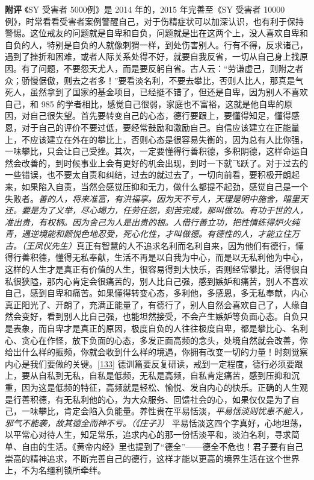 \begin{case}
    \textbf{附评} 《SY 受害者 5000例》是 2014 年的，2015 年完善至《SY 受害者 10000 例》，时常看看受害者案例警醒自己，对于伤精症状可以加深认识，也有利于保持警惕。这位戒友的问题就是自卑和自负，问题就是出在这两个上，没人喜欢自卑和自负的人，特别是自负的人就像刺猬一样，到处伤害别人。行有不得，反求诸己，遇到了挫折和困难，或者人际关系处得不好，就要自我反省，一切从自己身上找原因。有了问题，不要怨天尤人，而是要反躬自省。古人云：“劳谦虚己，则附之者众；骄慢倨傲，则去之者多！”要看淡名利，不要去攀比，否则人比人，那真是气死人，虽然拿到了国家的基金项目，已经挺不错了，但还是自卑，因为别人不喜欢自己，和 985 的学者相比，感觉自己很弱，家庭也不富裕，这就是他自卑的原因，对自己很失望。首先要转变自己的心态，德行要跟上，要懂得知足，懂得感恩，对于自己的评价不要过低，要经常鼓励和激励自己。自信应该建立在正能量上，不应该建立在外在的攀比上，否则心态是很容易失衡的，因为总有人比你强，一味攀比，只会让自己受挫。其次，一定要懂得行善积德，多积阴德，这样命运自然会改善的，到时候事业上会有更好的机会出现，到时一下就飞跃了。对于过去的一些错误，也不要太自责和纠结，过去的就过去了，一切向前看，要积极开朗起来，如果陷入自责，当然会感觉压抑和无力，做什么都提不起劲，感觉自己是一个失败者。\textit{善的人，将来准富，有洪福享。因为天不亏人，天理是明中施舍，暗里天还。要是为了义举，尽心竭力，任劳任怨，刻苦完成，那叫做功。有功于世的人，准出贵，有权柄。因为舍己为人是出贵的根。人借行善立功，把性情练得炉火纯青，遇逆境能和颜悦色地忍受，死心化性，才叫做德。有德性的人，才能立住万古。（王凤仪先生）}真正有智慧的人不追求名利而名利自来，因为他们有德行，懂得行善积德，懂得无私奉献，生活不再是以自我为中心，而是以无私利他为中心，这样的人生才是真正有价值的人生，很容易得到大快乐，否则经常攀比，活得很自私很狭隘，那内心肯定会很痛苦的，别人比自己强，感到嫉妒和痛苦，别人不喜欢自己，感到自卑和痛苦。如果懂得转变心态，多利他，多感恩，多无私奉献，内心真正阳光了、开朗了，充满正能量了，有德行了，别人自然会喜欢自己了，人缘自然会变好，看到别人比自己强，也能坦然接受，不会产生嫉妒等负面心态。自负只是表象，而自卑才是真正的原因，极度自负的人往往极度自卑，都是攀比心、名利心、贪心在作怪，放下负面的心态，多发正面高频的念头，处境自然就会改善，你给出什么样的振频，你就会收到什么样的境遇，你拥有改变一切的力量！时刻觉察内心是我们要做的关键。\ref{133} 德训篇要反复研读，戒到一定程度，德行必须要跟上，要从自私到无私，自私是低频，无私是高频，自私肯定痛苦，感到压抑和沉重，因为这是低频的特征，高频就是轻松、愉悦、发自内心的快乐。正确的人生观是行善积德，有无私利他的心，为大众服务、回馈社会的心，如果仅仅是为了自己，一味攀比，肯定会陷入负能量。养性贵在平易恬淡，\textit{平易恬淡则忧患不能入，邪气不能袭，故其德全而神不亏。（《庄子》）} 平易恬淡这四个字真好，心地坦荡，以平常心对待人生，知足常乐，追求内心的那一份恬淡平和，淡泊名利，寻求简单、自由的生活。《黄帝内经》里也提到了“德全”——德全不危也！君子要有自己崇高的精神追求，不断完善自己的德行，这样才能以更高的境界生活在这个世界上，不为名缰利锁所牵绊。
\end{case}

